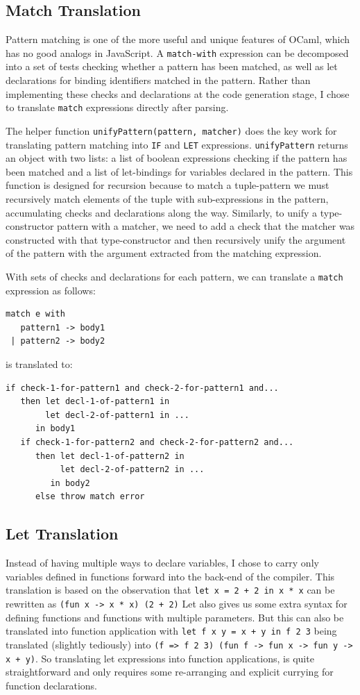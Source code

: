 \documentclass[12pt,a4paper,twoside,openright]{report}
\begin{document}
\subsection{Match Translation}
Pattern matching is one of the more useful and unique features of OCaml, which has no good analogs in JavaScript.
A {\tt match-with} expression can be decomposed into a set of tests checking whether a pattern has been matched, as well as let declarations for binding identifiers matched in the pattern.
Rather than implementing these checks and declarations at the code generation stage, I chose to translate {\tt match} expressions directly after parsing.

The helper function {\tt unifyPattern(pattern, matcher)} does the key work for translating pattern matching into {\tt IF} and {\tt LET} expressions.
{\tt unifyPattern} returns an object with two lists: a list of boolean expressions checking if the pattern has been matched and a list of let-bindings for variables declared in the pattern.
This function is designed for recursion because to match a tuple-pattern we must recursively match elements of the tuple with sub-expressions in the pattern, accumulating checks and declarations along the way.
Similarly, to unify a type-constructor pattern with a matcher, we need to add a check that the matcher was constructed with that type-constructor and then recursively unify the argument of the pattern with the argument extracted from the matching expression.

With sets of checks and declarations for each pattern, we can translate a {\tt match} expression as follows:
\begin{verbatim}
match e with
   pattern1 -> body1
 | pattern2 -> body2
\end{verbatim}
is translated to:
\begin{verbatim}
if check-1-for-pattern1 and check-2-for-pattern1 and...
   then let decl-1-of-pattern1 in
        let decl-2-of-pattern1 in ...
      in body1
   if check-1-for-pattern2 and check-2-for-pattern2 and...
      then let decl-1-of-pattern2 in
           let decl-2-of-pattern2 in ...
         in body2
      else throw match error
\end{verbatim}

\subsection{Let Translation}
Instead of having multiple ways to declare variables, I chose to carry only variables defined in functions forward into the back-end of the compiler.
This translation is based on the observation that {\tt let x = 2 + 2 in x * x} can be rewritten as {\tt (fun x -> x * x) (2 + 2)}
Let also gives us some extra syntax for defining functions and functions with multiple parameters.
But this can also be translated into function application with {\tt let f x y = x + y in f 2 3} being translated (slightly tediously) into {\tt (f => f 2 3) (fun f -> fun x -> fun y -> x + y)}.
So translating let expressions into function applications, is quite straightforward and only requires some re-arranging and explicit currying for function declarations.
\end{document}
